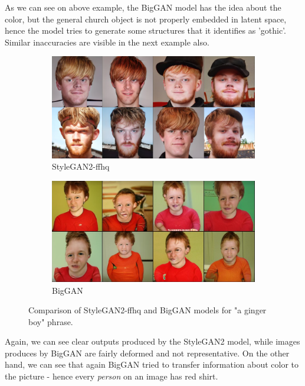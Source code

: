 \documentclass[12pt,a4paper,openany]{book}
\begin{document}
\noindent As we can see on above example, the BigGAN model has the idea about the color, but the general church object is not properly embedded in latent space, hence the model tries to generate some structures that it identifies as 'gothic'. Similar inaccuracies are visible in the next example also.

\begin{figure}[H]
\centering
\begin{subfigure}[b]{1.0\textwidth}
   \includegraphics[width=1\linewidth]{gingerboy_stylegan.PNG}
   \caption{StyleGAN2-ffhq}
   \label{fig:Ng1} 
\end{subfigure}

\begin{subfigure}[b]{1.0\textwidth}
   \includegraphics[width=1\linewidth]{gingerboy_biggan.PNG}
   \caption{BigGAN}
   \label{fig:Ng2}
\end{subfigure}
\caption[pics]{Comparison of StyleGAN2-ffhq and BigGAN models for "a ginger boy" phrase.}
\end{figure}

\noindent Again, we can see clear outputs produced by the StyleGAN2 model, while images produces by BigGAN are fairly deformed and not representative. On the other hand, we can see that again BigGAN tried to transfer information about color to the picture - hence every \textit{person} on an image has red shirt.\\
\end{document}
